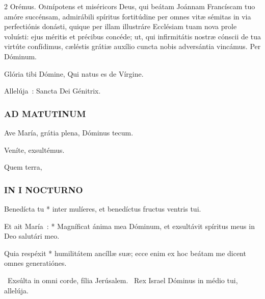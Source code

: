 \documentclass[9pt,twoside]{extarticle}
\begin{document}
\begin{multicols}{2}
\noindent Orémus. \hfill {}
\lettrine{O}mnípotens et miséricors Deus, qui beátam Joánnam Francíscam tuo amóre succénsam, admirábili spíritus fortitúdine per omnes vitæ sémitas in via perfectiónis donásti, quique per illam illustráre Ecclésiam tuam nova prole voluísti: ejus méritis et précibus concéde; ut, qui infirmitátis nostræ cónscii de tua virtúte confídimus, cæléstis grátiæ auxílio cuncta nobis adversántia vincámus. Per Dóminum.

\small {}


 Glória tibi Dómine, Qui natus es de Vírgine.

 Allelúja~: Sancta Dei Génitrix.
\normalsize

\subsubsection*{\center \normalfont \textsc{AD MATUTINUM}}
\indent {}

 Ave María, grátia plena, \textred{*} Dóminus tecum.

 Veníte, exsultémus. 

 Quem terra, 

\subsubsection*{\center \normalfont \small \textsc{IN I NOCTURNO}}

\smallskip
{} Benedícta tu * inter mulíeres, et benedíctus fructus ventris tui.

{\small {}}

 Et ait María~: * Magníficat ánima mea Dóminum, et exsultávit spíritus meus in Deo salutári meo.

 Quia respéxit * humilitátem ancíllæ suæ; ecce enim ex hoc beátam me dicent omnes generatiónes.

\smallskip
{}~Exsúlta in omni corde, fília Jerúsalem. ~Rex Israel Dóminus in médio tui, allelúja.


\end{multicols}
\end{document}
